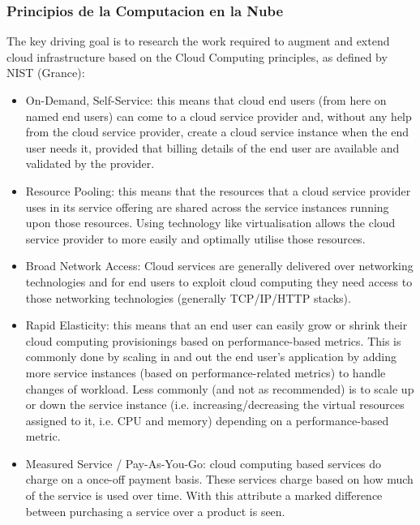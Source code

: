         \subsubsection{Principios de la Computacion en la Nube}
        The key driving goal is to research the work required to augment and extend cloud infrastructure based on the Cloud Computing principles, as defined by \addref{} NIST (Grance):
        \begin{itemize}
            \item On-Demand, Self-Service: this means that cloud end users (from here on named end users) can come to a cloud service provider and, without any help from the cloud service provider, create a cloud service instance when the end user needs it, provided that billing details of the end user are available and validated by the provider.
            \item Resource Pooling: this means that the resources that a cloud service provider uses in its service offering are shared across the service instances running upon those resources. Using technology like virtualisation allows the cloud service provider to more easily and optimally utilise those resources.
            \item Broad Network Access: Cloud services are generally delivered over networking technologies and for end users to exploit cloud computing they need access to those networking technologies (generally TCP/IP/HTTP stacks).
            \item Rapid Elasticity: this means that an end user can easily grow or shrink their cloud computing provisionings based on performance-based metrics. This is commonly done by scaling in and out the end user’s application by adding more service instances (based on performance-related metrics) to handle changes of workload. Less commonly (and not as recommended) is to scale up or down the service instance (i.e. increasing/decreasing the virtual resources assigned to it, i.e. CPU and memory) depending on a performance-based metric.
            \item Measured Service / Pay-As-You-Go: cloud computing based services do charge on a once-off payment basis. These services charge based on how much of the service is used over time. With this attribute a marked difference between purchasing a service over a product is seen.
        \end{itemize}
        
